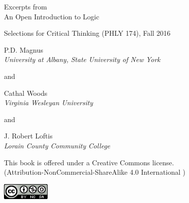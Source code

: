 \setlength{\parindent}{0em}
\thispagestyle{empty}


%


{\large Excerpts from}\\
\vfill
{\LARGE An Open Introduction to Logic}\\
\vfill 




{\large Selections for Critical Thinking (PHLY 174), Fall 2016} 


\vfill

{\sf P.D. Magnus}\\
\emph{University at Albany, State University of New York}

and

{\sf Cathal Woods}\\
\emph{Virginia Wesleyan University}

and

{\sf J. Robert Loftis}\\
\emph{Lorain County Community College}

\vfill

{\sf
	This book is offered under a Creative Commons license.\\
	(Attribution-NonCommercial-ShareAlike 4.0 International )
}

\includegraphics[width=66pt, height=23pt, keepaspectratio=true]{img/cc-by-nc-sa.png}


